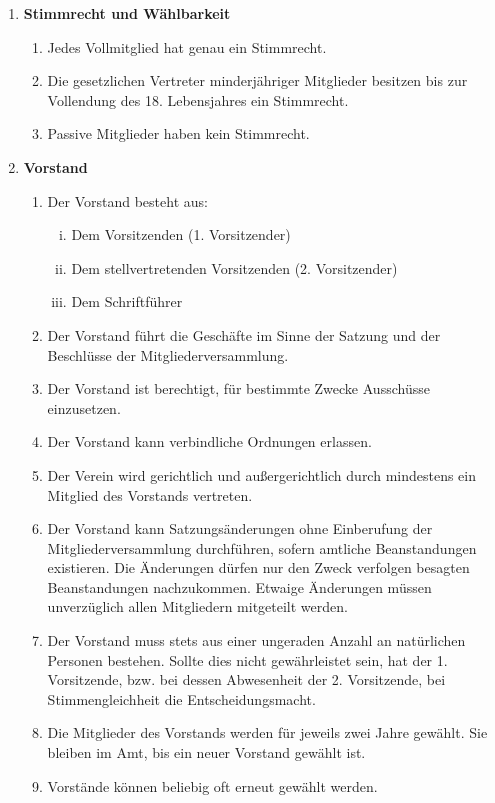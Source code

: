 \documentclass[a4paper,11pt]{article}
\begin{document}
\begin{enumerate}[§ 1.]
\item \textsf{\textbf{Stimmrecht und Wählbarkeit}}

\begin{enumerate}[1.]
\item Jedes Vollmitglied hat genau ein Stimmrecht.
\item Die gesetzlichen Vertreter minderjähriger Mitglieder besitzen bis zur Vollendung des 18.
Lebensjahres ein Stimmrecht.
\item Passive Mitglieder haben kein Stimmrecht.
\end{enumerate}

\item \textsf{\textbf{Vorstand}}

\begin{enumerate}[1.]
\item Der Vorstand besteht aus:
\begin{enumerate}[i)]
\item Dem Vorsitzenden (1. Vorsitzender)
\item Dem stellvertretenden Vorsitzenden (2. Vorsitzender)
\item Dem Schriftführer
\end{enumerate}
\item Der Vorstand führt die Geschäfte im Sinne der Satzung und der Beschlüsse der Mitgliederversammlung.
\item Der Vorstand ist berechtigt, für bestimmte Zwecke Ausschüsse einzusetzen.
\item Der Vorstand kann verbindliche Ordnungen erlassen.
\item Der Verein wird gerichtlich und außergerichtlich durch mindestens ein Mitglied des Vorstands vertreten.
\item Der Vorstand kann Satzungsänderungen ohne Einberufung der Mitgliederversammlung
durchführen, sofern amtliche Beanstandungen existieren. Die Änderungen dürfen nur den Zweck verfolgen besagten Beanstandungen nachzukommen. Etwaige Änderungen müssen unverzüglich allen Mitgliedern mitgeteilt werden.
\item Der Vorstand muss stets aus einer ungeraden Anzahl an natürlichen Personen bestehen. Sollte dies nicht gewährleistet sein, hat der 1. Vorsitzende, bzw. bei dessen Abwesenheit der 2. Vorsitzende, bei Stimmengleichheit die Entscheidungsmacht.
\item Die Mitglieder des Vorstands werden für jeweils zwei Jahre gewählt. Sie bleiben im Amt, bis ein neuer Vorstand gewählt ist.
\item Vorstände können beliebig oft erneut gewählt werden.

\end{enumerate}
\end{enumerate}
\end{document}
